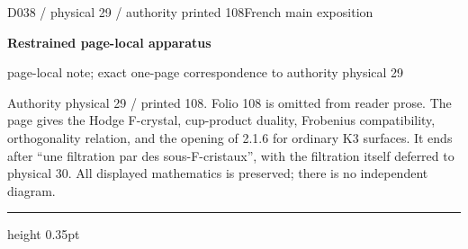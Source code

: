 \documentclass[9pt]{article}
\newcommand{\CanonText}[1]{\par{\fontsize{8.0}{9.35}\selectfont\RaggedRight #1\par}\vspace{2.2pt}}
\newcommand{\LayerTitle}{Restrained page-local apparatus}
\begin{document}
\noindent\begin{minipage}[t][\dimexpr\textheight-5pt\relax][t]{\textwidth}
{\sffamily\fontsize{7.3}{8.2}\selectfont\color{Quiet} D038 / physical 29 / authority printed 108\hfill French main exposition}
\par{}\vspace{4.5pt}
{\sffamily\fontsize{10.4}{11.6}\selectfont\bfseries\color{Accent} \LayerTitle}
\par{\sffamily\fontsize{6.7}{7.7}\selectfont\color{Quiet} page-local note; exact one-page correspondence to authority physical 29}
\vspace{5pt}
\CanonText{Authority physical 29 / printed 108. Folio 108 is omitted from reader prose. The page gives the Hodge F-crystal, cup-product duality, Frobenius compatibility, orthogonality relation, and the opening of 2.1.6 for ordinary K3 surfaces. It ends after “une filtration par des sous-F-cristaux”, with the filtration itself deferred to physical 30. All displayed mathematics is preserved; there is no independent diagram.}
\vfill
{\color{Accent}\hrule height 0.35pt}\vspace{3pt}
\end{minipage}
\newpage
\end{document}
